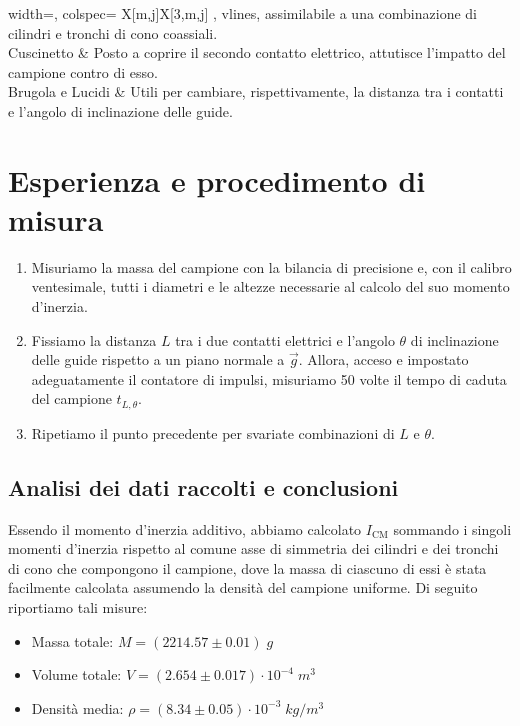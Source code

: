 \documentclass{article}
\begin{document}
\begin{center}
\begin{tblr}{
        width=\textwidth,
        colspec={ X[m,j]X[3,m,j] },
        vlines,
    }
{            assimilabile a una combinazione di
            cilindri e tronchi di cono coassiali.
        } \\
        \hline[dashed]
        Cuscinetto & {
            Posto a coprire il secondo contatto
            elettrico, attutisce l'impatto del campione
            contro di esso.
        } \\
        \hline[dashed]
        Brugola e Lucidi & {
            Utili per cambiare, rispettivamente,
            la distanza tra i contatti e l'angolo
            di inclinazione delle guide.
        } \\
        \hline
    \end{tblr}
\end{center}

\section{Esperienza e procedimento di misura}
\begin{enumerate}
    \item
        Misuriamo la massa del campione con la bilancia di precisione
        e, con il calibro ventesimale, tutti i diametri e le altezze
        necessarie al calcolo del suo momento d'inerzia.
    \item
        Fissiamo la distanza $L$ tra i due contatti elettrici
        e l'angolo $\theta$ di inclinazione delle guide
        rispetto a un piano normale a $\vec{g}$.
        Allora, acceso e impostato adeguatamente il contatore
        di impulsi, misuriamo 50 volte il tempo di caduta del
        campione $t_{L,\theta}$.
    \item
        Ripetiamo il punto precedente per svariate combinazioni
        di $L$ e $\theta$.

\end{enumerate}

\subsection{Analisi dei dati raccolti e conclusioni}
Essendo il momento d'inerzia additivo, abbiamo calcolato
$I_\text{CM}$ sommando i singoli momenti d'inerzia rispetto al comune
asse di simmetria dei cilindri e dei tronchi di cono che compongono il
campione, dove la massa di ciascuno di essi è stata facilmente
calcolata assumendo la densità del campione uniforme.
Di seguito riportiamo tali misure:

\begin{itemize}
    \item Massa totale: $M=(2214.57\pm0.01)\;\unit{g}$
    \item Volume totale: $V=(2.654\pm0.017)\cdot10^{-4}\;\unit{m^3}$
    \item Densità media: $\rho=(8.34\pm0.05)\cdot10^{-3}\;\unit{kg \per m^3}$
\end{itemize}
\end{document}
